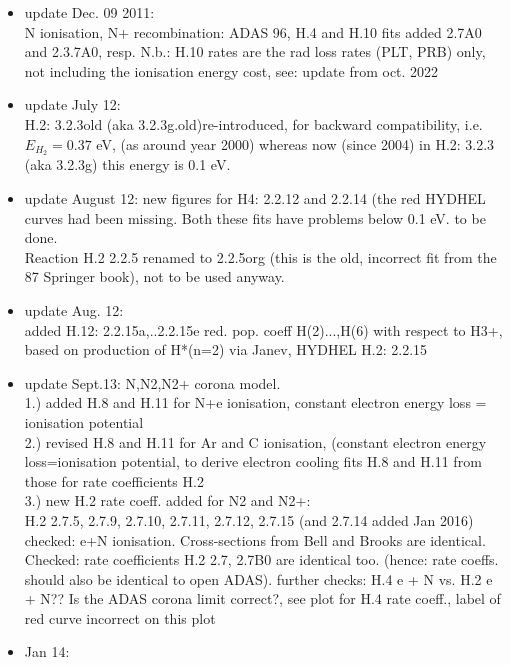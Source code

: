 \documentclass[12pt,dvipdfmx]{article}
\begin{document}
\begin{itemize}
  O ionisation, O+ recombination: ADAS 96, H.4 and H.10 fits added 2.8A0 and 2.3.8A0, resp.
  N.b.: H.10 rates are the rad loss rates (PLT, PRB) only, not including the ionisation energy cost,
  see: update from oct. 2022
  \item update Dec. 09 2011: \\
   N ionisation, N+ recombination: ADAS 96, H.4 and H.10 fits added 2.7A0 and 2.3.7A0, resp.
  N.b.: H.10 rates are the rad loss rates (PLT, PRB) only, not including the ionisation energy cost,
  see: update from oct. 2022
  \item update July 12:  \\
  H.2: 3.2.3old (aka 3.2.3g.old)re-introduced, for backward compatibility, i.e. $E_{H_2}=0.37$ eV, (as around year 2000)
  whereas now (since 2004) in  H.2: 3.2.3 (aka 3.2.3g) this energy is 0.1 eV.
  \item update August 12: new figures for H4: 2.2.12 and 2.2.14 (the red
  HYDHEL curves had been missing. Both these fits have problems below 0.1 eV. to be done.\\
  Reaction H.2 2.2.5 renamed to 2.2.5org (this is the old, incorrect fit from the 87 Springer book),
  not to be used anyway.
  \item update Aug. 12: \\
  added H.12: 2.2.15a,..2.2.15e red. pop. coeff H(2)...,H(6) with respect to H3+,
  based on production of H*(n=2) via Janev, HYDHEL H.2: 2.2.15
  \item update Sept.13: N,N2,N2+ corona model. \\
  1.) added H.8 and H.11 for N+e ionisation, constant electron energy loss = ionisation potential\\
  2.) revised H.8 and H.11 for Ar and C ionisation, (constant electron energy loss=ionisation potential,
  to derive electron cooling fits H.8 and H.11 from those for rate coefficients H.2\\
  3.) new H.2 rate coeff. added for N2 and N2+:        \\
  H.2 2.7.5, 2.7.9, 2.7.10, 2.7.11, 2.7.12, 2.7.15  (and 2.7.14 added Jan 2016)
  \\
  checked: e+N ionisation. Cross-sections from Bell and Brooks are identical.
  Checked: rate coefficients H.2  2.7, 2.7B0 are identical too.
  (hence: rate coeffs. should also be identical to open ADAS).
  further checks:
  H.4 e + N vs. H.2 e + N?? Is the ADAS corona limit correct?, see plot for H.4 rate coeff.,
  label of red curve incorrect on this plot
  \item Jan 14:\\

\end{itemize}
\end{document}
